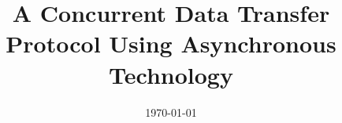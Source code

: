 \documentclass[a4paper, 11pt, oneside]{Thesis}  %
\begin{document}
\frontmatter      %

\title  {A Concurrent Data Transfer Protocol Using Asynchronous Technology}
\addresses  {\groupname\\\deptname\\\univname}  %
\date       {\today}
\subject    {}
\keywords   {}

\maketitle


\fancyhead{}  %
\rhead{\thepage}  %
\lhead{}  %

\pagestyle{fancy}  %




 
 
\end{document}

